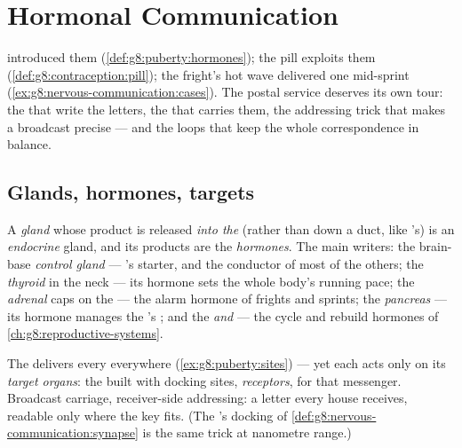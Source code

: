 \chapter{Hormonal Communication}\label{ch:g8:hormonal-communication}

 introduced them
(\cref{def:g8:puberty:hormones}); the pill exploits them
(\cref{def:g8:contraception:pill}); the fright's hot wave
delivered one mid-sprint
(\cref{ex:g8:nervous-communication:cases}). The postal
service deserves its own tour: the  that write the
letters, the  that carries them, the addressing trick
that makes a broadcast precise --- and the  loops
that keep the whole correspondence in balance.

\section{Glands, hormones, targets}

\begin{definition}\label{def:g8:hormonal-communication:glands}
A \emph{gland} whose product is released
\emph{into the } (rather than down a duct, like
's) is an \emph{endocrine} gland, and its products
are the \emph{hormones}. The main writers:
the brain-base \emph{control gland} --- 's
starter, and the conductor of most of the others; the
\emph{thyroid} in the neck --- its hormone sets the whole
body's running pace; the \emph{adrenal} caps on the
 --- the alarm hormone of frights and sprints; the
\emph{pancreas} --- its hormone manages the 's
; and the \emph{ and } --- the cycle
and rebuild hormones of
\cref{ch:g8:reproductive-systems}.
\end{definition}

\begin{proposition}\label{prop:g8:hormonal-communication:address}
The  delivers every  everywhere
(\cref{ex:g8:puberty:sites}) --- yet each acts only on
its \emph{target organs}: the 
built with docking sites, \emph{receptors}, for that
messenger. Broadcast carriage, receiver-side addressing:
a letter every house receives, readable only where the
key fits. (The 's docking of
\cref{def:g8:nervous-communication:synapse} is the same
trick at nanometre range.)
\end{proposition}
\admitted

